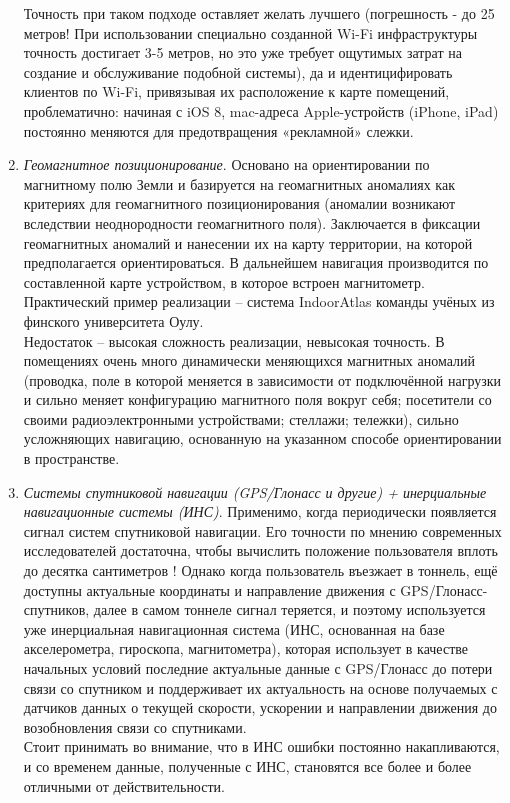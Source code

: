 \begin{enumerate}
    Точность при таком подходе оставляет желать лучшего (погрешность - до 25 метров! При использовании специально созданной Wi-Fi инфраструктуры точность достигает 3-5 метров, но это уже требует ощутимых затрат на создание и обслуживание подобной системы), да и идентицифировать клиентов по Wi-Fi, привязывая их расположение к карте помещений, проблематично: начиная с iOS 8, mac-адреса Apple-устройств (iPhone, iPad) постоянно меняются для предотвращения «рекламной» слежки.
    \item
    \textit{Геомагнитное позиционирование}. Основано на ориентировании по магнитному полю Земли и базируется на геомагнитных аномалиях как критериях для геомагнитного позиционирования (аномалии возникают вследствии неоднородности геомагнитного поля). Заключается в фиксации геомагнитных аномалий и нанесении их на карту территории, на которой предполагается ориентироваться. В дальнейшем навигация производится по составленной карте устройством, в которое встроен магнитометр. Практический пример реализации – система IndoorAtlas команды учёных из финского университета Оулу. \\
    Недостаток – высокая сложность реализации, невысокая точность. В помещениях очень много динамически меняющихся магнитных аномалий (проводка, поле в которой меняется в зависимости от подключённой нагрузки и сильно меняет конфигурацию магнитного поля вокруг себя; посетители со своими радиоэлектронными устройствами; стеллажи; тележки), сильно усложняющих навигацию, основанную на указанном способе ориентировании в пространстве.
    \item
    \textit{Системы спутниковой навигации (GPS/Глонасс и другие) + инерциальные навигационные системы (ИНС)}. Применимо, когда периодически появляется сигнал систем спутниковой навигации. Его точности по мнению современных исследователей достаточна, чтобы вычислить положение пользователя вплоть до десятка сантиметров \cite{web:GPScent}! Однако когда пользователь въезжает в тоннель, ещё доступны актуальные координаты и направление движения с GPS/Глонасс-спутников, далее в самом тоннеле сигнал теряется, и поэтому используется уже инерциальная навигационная система (ИНС, основанная на базе акселерометра, гироскопа, магнитометра), которая использует в качестве начальных условий последние актуальные данные с GPS/Глонасс до потери связи со спутником и поддерживает их актуальность на основе получаемых с датчиков данных о текущей скорости, ускорении и направлении движения до возобновления связи со спутниками. \\
    Стоит принимать во внимание, что в ИНС ошибки постоянно накапливаются, и со временем данные, полученные с ИНС, становятся все более и более отличными от действительности.

\end{enumerate}
